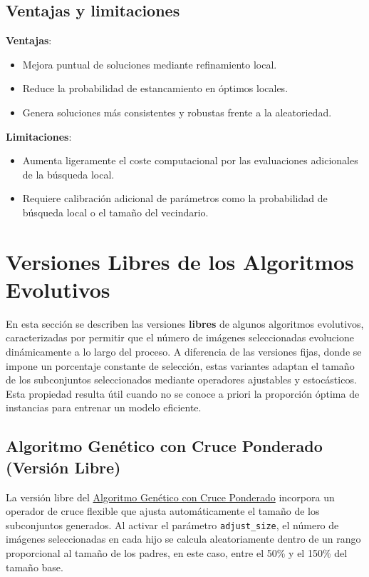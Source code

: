 \subsection{Ventajas y limitaciones}\label{subsec:ventajas-y-limitaciones-memetico}
\textbf{Ventajas}:
\begin{itemize}
      \item Mejora puntual de soluciones mediante refinamiento local.
      \item Reduce la probabilidad de estancamiento en óptimos locales.
      \item Genera soluciones más consistentes y robustas frente a la aleatoriedad.
\end{itemize}

\textbf{Limitaciones}:
\begin{itemize}
      \item Aumenta ligeramente el coste computacional por las evaluaciones adicionales de la búsqueda local.
      \item Requiere calibración adicional de parámetros como la probabilidad de búsqueda local o el tamaño del vecindario.
\end{itemize}

\section{Versiones Libres de los Algoritmos Evolutivos}\label{sec:versiones-libres}
En esta sección se describen las versiones \textbf{libres} de algunos algoritmos evolutivos,
caracterizadas por permitir que el número de imágenes seleccionadas evolucione dinámicamente a lo largo del proceso.
A diferencia de las versiones fijas, donde se impone un porcentaje constante de selección,
estas variantes adaptan el tamaño de los subconjuntos seleccionados mediante operadores ajustables y estocásticos.
Esta propiedad resulta útil cuando no se conoce a priori la proporción óptima de instancias para entrenar un modelo eficiente.

\subsection{Algoritmo Genético con Cruce Ponderado (Versión Libre)}\label{subsec:genetico-v2-libre}

La versión libre del \hyperref[sec:genetico-v2]{Algoritmo Genético con Cruce Ponderado} incorpora un operador de
cruce flexible que ajusta automáticamente el tamaño de los subconjuntos generados.
Al activar el parámetro \texttt{adjust\_size}, el número de imágenes seleccionadas en cada hijo se calcula aleatoriamente
dentro de un rango proporcional al tamaño de los padres, en este caso, entre el 50\% y el 150\% del tamaño base.

